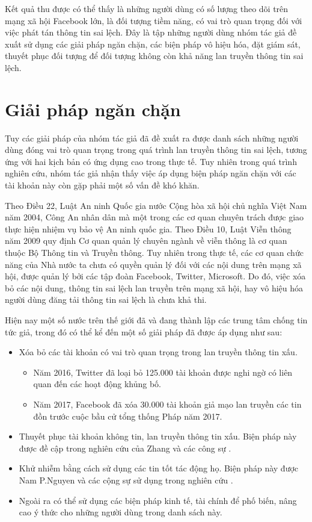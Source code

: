 Kết quả thu được có thể thấy là những người dùng có số lượng theo dõi trên mạng xã hội Facebook lớn, là đối tượng tiềm năng, có vai trò quan trọng đối với việc phát tán thông tin sai lệch. Đây là tập những người dùng nhóm tác giả đề xuất sử dụng các giải pháp ngăn chặn, các biện pháp vô hiệu hóa, đặt giám sát, thuyết phục đối tượng để đối tượng không còn khả năng lan truyền thông tin sai lệch.

\section{Giải pháp ngăn chặn}
Tuy các giải pháp của nhóm tác giả đã đề xuất ra được danh sách những người dùng đóng vai trò quan trọng trong quá trình lan truyền thông tin sai lệch, tương ứng với hai kịch bản có ứng dụng cao trong thực tế. Tuy nhiên trong quá trình nghiên cứu, nhóm tác giả nhận thấy việc áp dụng biện pháp ngăn chặn với các tài khoản này còn gặp phải một số vấn đề khó khăn.

Theo Điều 22, Luật An ninh Quốc gia nước Cộng hòa xã hội chủ nghĩa Việt Nam năm 2004, Công An nhân dân mà một trong các cơ quan chuyên trách được giao thực hiện nhiệm vụ bảo vệ An ninh quốc gia. Theo Điều 10, Luật Viễn thông năm 2009 quy định Cơ quan quản lý chuyên ngành về viễn thông là cơ quan thuộc Bộ Thông tin và Truyền thông. Tuy nhiên trong thực tế, các cơ quan chức năng của Nhà nước ta chưa có quyền quản lý đối với các nội dung trên mạng xã hội, được quản lý bởi các tập đoàn Facebook, Twitter, Microsoft. Do đó, việc xóa bỏ các nội dung, thông tin sai lệch lan truyền trên mạng xã hội, hay vô hiệu hóa người dùng đăng tải thông tin sai lệch là chưa khả thi. 

Hiện nay một số nước trên thế giới đã và đang thành lập các trung tâm chống tin tức giả, trong đó có thể kể đến một số giải pháp đã được áp dụng như sau:
\begin{itemize}
	\item Xóa bỏ các tài khoản có vai trò quan trọng trong lan truyền thông tin xấu.
	\begin{itemize}
		\item Năm 2016, Twitter đã loại bỏ 125.000 tài khoản được nghi ngờ có liên quan đến các hoạt động khủng bố. 
		\item Năm 2017, Facebook đã xóa 30.000 tài khoản giả mạo lan truyền các tin đồn trước cuộc bầu cử tổng thống Pháp năm 2017.
	\end{itemize}
	
	\item Thuyết phục tài khoản không tin, lan truyền thông tin xấu. Biện pháp này được đề cập trong nghiên cứu của Zhang và các công sự  \cite{ZhangXoaTinXau1, ZhangXoaTinXau2}.
	
	\item Khử nhiễm bằng cách sử dụng các tin tốt tác động họ. Biện pháp này được Nam P.Nguyen và các cộng sự sử dụng trong nghiên cứu \cite{nguyen9}.
	
	\item Ngoài ra có thể sử dụng các biện pháp kinh tế, tài chính để phố biến, nâng cao ý thức cho những người dùng trong danh sách này.
\end{itemize}

